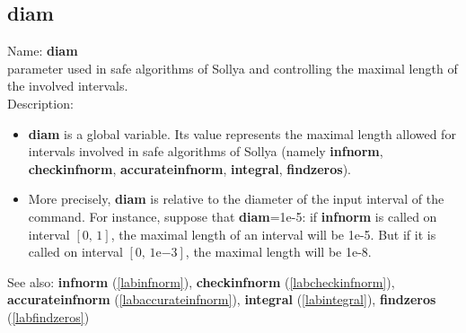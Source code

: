 \subsection{diam}
\label{labdiam}
\noindent Name: \textbf{diam}\\
parameter used in safe algorithms of Sollya and controlling the maximal length of the involved intervals.\\

\noindent Description: \begin{itemize}

\item \textbf{diam} is a global variable. Its value represents the maximal length allowed
   for intervals involved in safe algorithms of Sollya (namely \textbf{infnorm},
   \textbf{checkinfnorm}, \textbf{accurateinfnorm}, \textbf{integral}, \textbf{findzeros}).

\item More precisely, \textbf{diam} is relative to the diameter of the input interval of
   the command. For instance, suppose that \textbf{diam}=1e-5: if \textbf{infnorm} is called
   on interval $[0,\,1]$, the maximal length of an interval will be 1e-5. But if it
   is called on interval $[0,\,1\mathrm{e}{-3}]$, the maximal length will be 1e-8.
\end{itemize}
See also: \textbf{infnorm} (\ref{labinfnorm}), \textbf{checkinfnorm} (\ref{labcheckinfnorm}), \textbf{accurateinfnorm} (\ref{labaccurateinfnorm}), \textbf{integral} (\ref{labintegral}), \textbf{findzeros} (\ref{labfindzeros})
